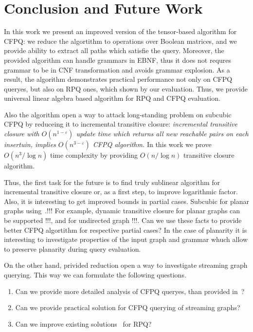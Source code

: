 \section{Conclusion and Future Work}

In this work we present an improved version of the tensor-based algorithm for CFPQ: we reduce the algortithm to operations over Boolean matrices, and we provide ability to extract all paths which satisfie the query.
Moreover, the provided algorithm can handle grammars in EBNF, thus it does not requres grammar to be in CNF transformation and avoids grammar explosion.
As a result, the algorithm demonstrates practical performance not only on CFPQ queryes, but also on RPQ ones, which shown by our evaluation. 
Thus, we provide universal linear algebra based algorithm for RPQ and CFPQ evaluation.

Also the algorithm open a way to attack long-standing problem on subcubic CFPQ by reduceing it to incremental transitive closure: \textit{incremental transitive closure with $O(n^{1-\varepsilon})$ update time which returns all new reachable pairs on each insertuin, implies $O(n^{3-\varepsilon})$ CFPQ algorithm.}
In this work we prove $O(n^3/\log{n})$ time complexity by providing $O(n/\log{n})$ transitive closure algorithm.

Thus, the first task for the future is to find truly sublinear algorithm for incremental transitive closure or, as a first step, to improve logarithmic factor.
Also, it is interesting to get improved bounds in partial cases.
Subcubic for planar graphs using~\cite{10.1007/3-540-57273-2_72}.!!!
For example, dynamic transitive closure for planar graphs can be supported !!!, and for undirected graph !!!. Can we use these facts to provide better CFPQ algortithm for respective partial cases? 
In the case of planarity it is interesting to investigate properties of the input graph and grammar whuch allow to preserve planarity during query evaluation.

On the other hand, privided reduction open a way to investigate streaming graph querying.
This way we can formulate the following questions.
\begin{enumerate}
\item Can we provide more detailed analysis of CFPQ queryes, than provided in~\cite{!!!}?
\item Can we provide practical solution for CFPQ querying of streaming graphs?
\item Can we improve existing solutions~\cite{Pacaci2020RegularPQ} for RPQ?
\end{enumerate}

